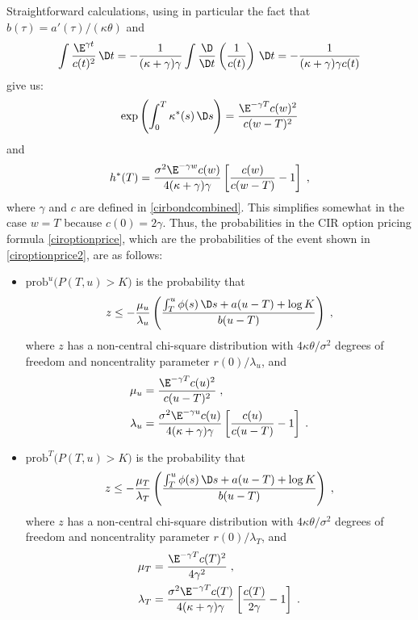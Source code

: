 Straightforward  calculations, using in particular the fact that $b(\tau) = a'(\tau)/(\kappa\theta)$ and 
$$\int \frac{\E^{\gamma t}}{c(t)^2}\,\D t = -\frac{1}{(\kappa+\gamma)\gamma} \int \frac{\D}{\D t}\left(\frac{1}{c(t)}\right)\,\D t = -\frac{1}{(\kappa+\gamma)\gamma c(t)}$$
give us:
$$\exp\left(\int_0^T \kappa^*(s)\,\D s\right) = \frac{\E^{-\gamma T}c(w)^2}{c(w-T)^2}$$
and
$$h^*(T) =\frac{\sigma^2\E^{-\gamma w}c(w)}{4(\kappa + \gamma)\gamma}\left[\frac{c(w)}{c(w-T)}-1\right]\; ,$$
where $\gamma$ and $c$ are defined in \eqref{cirbondcombined}.  This simplifies somewhat in the case $w=T$ because $c(0) = 2\gamma$.  Thus, the probabilities in the CIR option pricing formula \eqref{ciroptionprice}, which are the probabilities of the event shown in \eqref{ciroptionprice2}, are as follows:
\begin{itemize}
\item $\text{prob}^u\big(P(T,u)>K\big)$ is the probability that 
$$z \leq -\frac{\mu_u}{\lambda_u}\left(\frac{\int_T^u \phi(s)\,\D s+a(u-T)+\log K}{b(u-T)}\right)\; ,$$
where $z$ has a non-central chi-square distribution with $4\kappa\theta/\sigma^2$ degrees of freedom and noncentrality parameter $r(0)/\lambda_u$, and
\begin{align*}
\mu_u & = \frac{\E^{-\gamma T}c(u)^2}{c(u-T)^2}\; ,\\
\lambda_u & = \frac{\sigma^2\E^{-\gamma u}c(u)}{4(\kappa + \gamma)\gamma}\left[\frac{c(u)}{c(u-T)}-1\right]\;.
\end{align*}
\item $\text{prob}^T\big(P(T,u)>K\big)$ is the probability that 
$$z \leq -\frac{\mu_T}{\lambda_T}\left(\frac{\int_T^u \phi(s)\,\D s+a(u-T)+\log K}{b(u-T)}\right)\; ,$$
where $z$ has a non-central chi-square distribution with $4\kappa\theta/\sigma^2$ degrees of freedom and noncentrality parameter $r(0)/\lambda_T$, and
\begin{align*}
\mu_T & = \frac{\E^{-\gamma T}c(T)^2}{4\gamma^2}\; ,\\
\lambda_T & = \frac{\sigma^2\E^{-\gamma T}c(T)}{4(\kappa + \gamma)\gamma}\left[\frac{c(T)}{2\gamma}-1\right]\;.
\end{align*}
\end{itemize}
